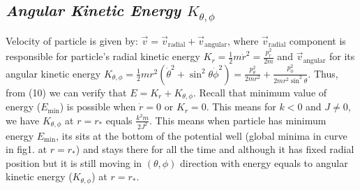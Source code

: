 \documentclass[conference]{IEEEtran}
\begin{document}
 \subsection{\normalsize{\emph{\textbf{Angular Kinetic Energy $K_{\theta,\phi}$}}}}
 Velocity of particle is given by: $\vec{v} = \vec v_{\mathrm{radial}} + \vec v_{\mathrm{angular}}$, where $\vec v_{\mathrm{radial}}$ component is responsible for particle's radial kinetic energy $K_{r} = \frac{1}{2}m\dot{r}^{2} = \frac{p_{r}^{2}}{2m}$ and $\vec v_{\mathrm{angular}}$ for its angular kinetic energy $K_{\theta,\phi} =\frac{1}{2}mr^{2}(\dot{\theta}^{2} + \sin^{2}{\theta}\dot{\phi}^{2}) = \frac{p_{\theta}^{2}}{2mr^{2}} + \frac{p_{\phi}^{2}}{2mr^{2}\sin^2{\theta}} $. Thus, from (10) we can verify that $E = K_{r} + K_{\theta,\phi}$. Recall that  minimum value of energy ($E_{\mathrm{min}}$) is possible when $\dot{r} = 0$ or $K_{r} = 0$. This means for $k<0$ and $J\not=0$, we have $K_{\theta,\phi}$ at $r=r_{*}$ equals $\frac{k^{2}m}{2J^{2}}$. This means when particle has minimum energy $E_{\mathrm{min}}$, its sits at the bottom of the potential well (global minima in curve in fig1. at $r=r_{*}$) and stays there for all the time and although it has fixed radial position but it is still moving in $(\theta,\phi)$ direction with energy equals to angular kinetic energy ($K_{\theta,\phi}$) at $r=r_{*}$.
 \vspace{1em}
 
 
 
\end{document}
